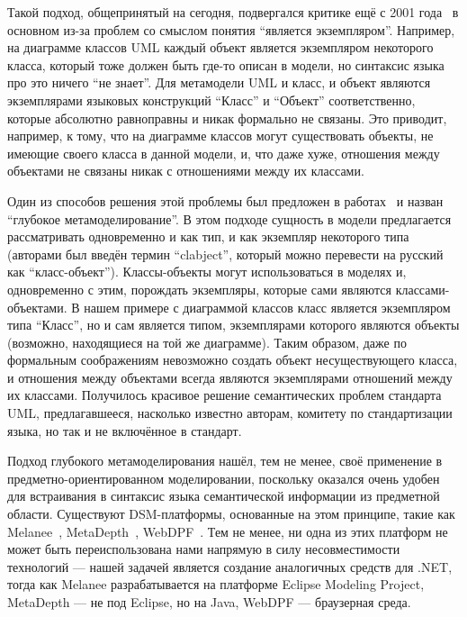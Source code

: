 \documentclass{spisok-article}
\begin{document}
Такой подход, общепринятый на сегодня, подвергался критике ещё с 2001 года~\cite{atkinson2001multilevel} в основном из-за проблем со смыслом понятия ``является экземпляром''. Например, на диаграмме классов UML каждый объект является экземпляром некоторого класса, который тоже должен быть где-то описан в модели, но синтаксис языка про это ничего ``не знает''. Для метамодели UML и класс, и объект являются экземплярами языковых конструкций ``Класс'' и ``Объект'' соответственно, которые абсолютно равноправны и никак формально не связаны. Это приводит, например, к тому, что на диаграмме классов могут существовать объекты, не имеющие своего класса в данной модели, и, что даже хуже, отношения между объектами не связаны никак с отношениями между их классами.

Один из способов решения этой проблемы был предложен в работах~\cite{atkinson2001multilevel, atkinson2003model, atkinson2015defence} и назван ``глубокое метамоделирование''. В этом подходе сущность в модели предлагается рассматривать одновременно и как тип, и как экземпляр некоторого типа (авторами был введён термин ``clabject'', который можно перевести на русский как ``класс-объект''). Классы-объекты могут использоваться в моделях и, одновременно с этим, порождать экземпляры, которые сами являются классами-объектами. В нашем примере с диаграммой классов класс является экземпляром типа ``Класс'', но и сам является типом, экземплярами которого являются объекты (возможно, находящиеся на той же диаграмме). Таким образом, даже по формальным соображениям невозможно создать объект несуществующего класса, и отношения между объектами всегда являются экземплярами отношений между их классами. Получилось красивое решение семантических проблем стандарта UML, предлагавшееся, насколько известно авторам, комитету по стандартизации языка, но так и не включённое в стандарт.

Подход глубокого метамоделирования нашёл, тем не менее, своё применение в предметно-ориентированном моделировании, поскольку оказался очень удобен для встраивания в синтаксис языка семантической информации из предметной области. Существуют DSM-платформы, основанные на этом принципе, такие как Melanee~\cite{atkinson2016melanee}, MetaDepth~\cite{delara2010deep, delara2012domain}, WebDPF~\cite{rabbi2016webdpf}. Тем не менее, ни одна из этих платформ не может быть переиспользована нами напрямую в силу несовместимости технологий --- нашей задачей является создание аналогичных средств для .NET, тогда как Melanee разрабатывается на платформе Eclipse Modeling Project, MetaDepth --- не под Eclipse, но на Java, WebDPF --- браузерная среда.
\end{document}
